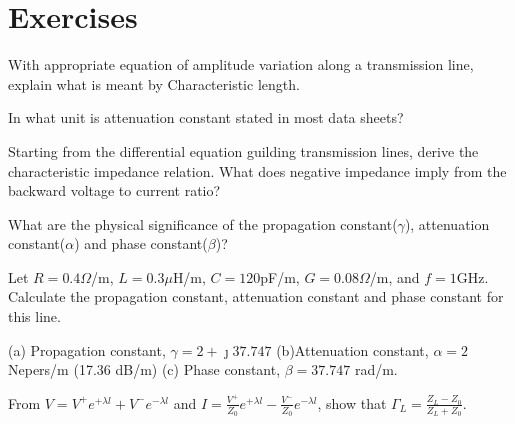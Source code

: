 \section*{Exercises}
\begin{ExerciseList}
\Exercise[label={ex31}]
With appropriate equation of amplitude variation along a transmission line, explain what is meant by Characteristic length.

\Exercise[label={ex32}]
In what unit is attenuation constant stated in most data sheets?

\Exercise[label={ex33}]
Starting from the differential equation guilding transmission lines, derive the characteristic impedance relation. What does negative impedance imply from the backward voltage to current ratio?

\Exercise[label={ex34}]
What are the physical significance of the propagation constant($\gamma$), attenuation constant($\alpha$) and phase constant($\beta$)?

\Exercise[label={ex35}]
Let $R = 0.4\varOmega$/m, $L = 0.3\mu$H/m, $C = 120$pF/m, $G = 0.08\varOmega$/m, and $f = 1$GHz. Calculate the propagation constant, attenuation constant and phase constant for this line.

\Answer[ref={ex35}]
(a) Propagation constant, $\gamma = 2 +\jmath 37.747$ (b)Attenuation constant, $\alpha = 2$ Nepers/m (17.36 dB/m) (c) Phase constant, $\beta = 37.747 $ rad/m.

\Exercise[label={ex36}]
From $ V = V^+e^{+\lambda l} + V^-e^{-\lambda l} $ and $ I = \frac{V^+}{Z_0}e^{+\lambda l} - \frac{V^-}{Z_0}e^{-\lambda l}$, show that $ \Gamma_L = \frac{Z_L - Z_0}{Z_L + Z_0} $.
\end{ExerciseList}